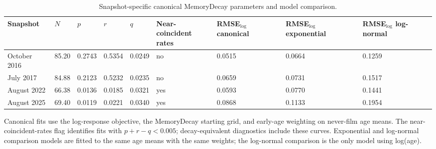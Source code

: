 \begin{table}[!htbp]
\centering
\footnotesize
\caption{Snapshot-specific canonical MemoryDecay parameters and model comparison.}
\label{tab:si-memorydecay-fits}
\renewcommand{\arraystretch}{1.05}
\begin{tabular}{lllllllll}
\toprule
Snapshot & $N$ & $p$ & $r$ & $q$ & \makecell[b]{Near-coincident\\ rates} & \makecell[b]{RMSE$_{\log}$\\ canonical} & \makecell[b]{RMSE$_{\log}$\\ exponential} & \makecell[b]{RMSE$_{\log}$\\ log-normal} \\
\midrule
October 2016 & 85.20 & 0.2743 & 0.5354 & 0.0249 & no & 0.0515 & 0.0664 & 0.1259 \\
July 2017 & 84.88 & 0.2123 & 0.5232 & 0.0235 & no & 0.0659 & 0.0731 & 0.1517 \\
August 2022 & 66.38 & 0.0136 & 0.0185 & 0.0321 & yes & 0.0593 & 0.0770 & 0.1441 \\
August 2025 & 69.40 & 0.0119 & 0.0221 & 0.0340 & yes & 0.0868 & 0.1133 & 0.1954 \\
\bottomrule
\end{tabular}
\begin{flushleft}\footnotesize
Canonical fits use the log-response objective, the MemoryDecay starting grid, and early-age weighting on never-film age means. The near-coincident-rates flag identifies fits with $p+r-q<0.005$; decay-equivalent diagnostics include these curves. Exponential and log-normal comparison models are fitted to the same age means with the same weights; the log-normal comparison is the only model using log(age).
\end{flushleft}
\end{table}
